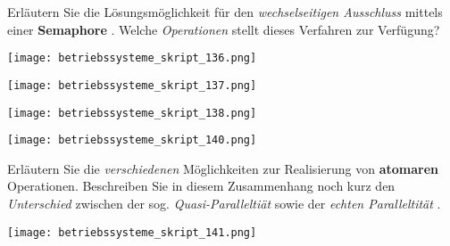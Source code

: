\documentclass{article}
\begin{document}
\begin{tcolorbox}[colback=white!10!white,colframe=lightgray!75!black,
  savelowerto=\jobname_ex.tex,breakable,enhanced,lines before break=40]

\begin{center}
Erläutern Sie die Lösungsmöglichkeit für den 
\textit{wechselseitigen Ausschluss
} mittels einer 
\textbf{Semaphore
}. Welche 
\textit{Operationen
} stellt dieses Verfahren zur Verfügung?

\end{center}

\tcblower

\justifying
\begin{center}
\texttt{[image: betriebssysteme\_skript\_136.png]}
\end{center}
\begin{center}
\texttt{[image: betriebssysteme\_skript\_137.png]}
\end{center}
\begin{center}
\texttt{[image: betriebssysteme\_skript\_138.png]}
\end{center}
\begin{center}
\texttt{[image: betriebssysteme\_skript\_140.png]}
\end{center}

\end{tcolorbox}
\begin{tcolorbox}[colback=white!10!white,colframe=lightgray!75!black,
  savelowerto=\jobname_ex.tex,breakable,enhanced,lines before break=40]

\begin{center}
Erläutern Sie die 
\textit{verschiedenen
} Möglichkeiten zur Realisierung von 
\textbf{atomaren
} Operationen.
Beschreiben Sie in diesem Zusammenhang noch kurz den 
\textit{Unterschied
} zwischen der sog. 
\textit{Quasi-Paralleltiät
} sowie der 
\textit{echten Paralleltität
}.

\end{center}

\tcblower

\justifying
\begin{center}
\texttt{[image: betriebssysteme\_skript\_141.png]}
\end{center}

\end{tcolorbox}
\end{document}
